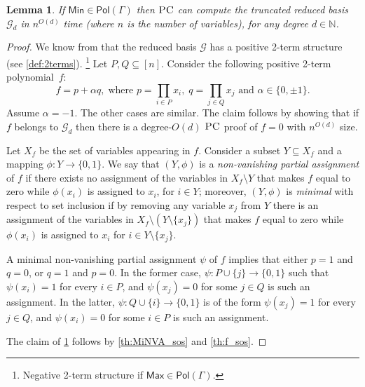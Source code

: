 \documentclass[11pt]{article}
\newcommand{\Pol}{\textsf{Pol}}
\newcommand{\PC}{\textsc{PC}}
\newcommand{\Max}{\textsf{Max}}
\newcommand{\Min}{\textsf{Min}}
\newcommand{\1}{\textbf{1}}
\newcommand{\GB}{\text{Gr\"{o}bner} }
\newtheorem{lemma}[theorem]{Lemma}
\begin{document}
\begin{lemma}\label{th:Min}
If $\Min\in\Pol(\Gamma)$ then $\PC$ can compute the truncated reduced \GB basis $\mathcal{G}_d$ in $n^{O(d)}$ time (where $n$ is the number of variables), for any degree $d\in \mathbb{N}$.
\end{lemma}
\begin{proof}
We know from \cite{Mastrolilli21TALG} that the reduced \GB basis $\mathcal{G}$ has a positive 2-term structure (see \cref{def:2terms}). \footnote{Negative 2-term structure if $\Max\in\Pol(\Gamma)$.} Let $P,Q\subseteq [n]$.  Consider the following positive 2-term polynomial~$f$:
%
\begin{equation*}
f = p +\alpha q, \;
\text{where } p = \prod_{i\in P} x_i,\; q = \prod_{j\in Q} x_j \text{ and } \alpha \in \{0,\pm 1\}.
\end{equation*}
% 
Assume $\alpha = -1$. The other cases are similar. The claim follows by showing that if $f$ belongs to $\mathcal{G}_d$ then there is a degree-$O(d)$ $\PC$ proof of $f=0$ with $n^{O(d)}$ size. 

Let $X_f$ be the set of variables appearing in $f$. Consider a subset $Y\subseteq X_f$ and a mapping $\phi: Y\rightarrow \{0,1\}$. We say that $(Y,\phi)$ is a \emph{non-vanishing partial assignment} of $f$ if there exists no assignment of the variables in $X_f\setminus Y$ that makes $f$ equal to zero while {$\phi(x_i)$ is assigned to $x_i$}, for $i\in Y$; moreover, $(Y,\phi)$ is \emph{minimal} with respect to set inclusion if by removing any variable $x_j$ from $Y$ there is an assignment of the variables in $X_f\setminus (Y\setminus\{x_j\})$ that makes $f$ equal to zero while {$\phi(x_i)$ is assigned to $x_i$} for $i\in Y\setminus\{x_j\}$.

A minimal non-vanishing partial assignment {$\psi$} of $f$ implies that either $p=1$ and $q=0$, or $q=1$ and $p=0$. {In the former case, $\psi:P\cup\{j\}\rightarrow \{0,1\}$ such that $\psi(x_i)=1$ for every $i\in P$, and $\psi(x_j)=0$ for some $j \in Q$ is such an assignment.
In the latter, $\psi:Q\cup\{i\}\rightarrow \{0,1\}$ is of the form $\psi(x_j)=1$ for every $j\in Q$, and $\psi(x_i)=0$ for some $i \in P$ is such an assignment.}

The claim of \cref{th:Min} follows by \cref{th:MiNVA_sos} and \cref{th:f_sos}.
\end{proof}
%
\end{document}
